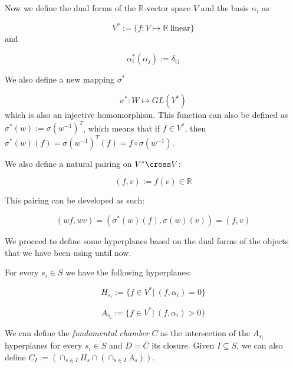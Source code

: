 Now we define the dual forms of the $\mathbb{R}$-vector space $V$ and the basis $\alpha_i$ as

\begin{equation}
 V^* := \{f: V \mapsto \mathbb{R}\  \text{linear} \}
\end{equation}
and

\begin{equation}
  \alpha_i^* (\alpha_j) := \delta_{ij}
\end{equation}

We also define a new mapping $\sigma^*$

\begin{equation}
 \sigma^* : W \mapsto GL(V^*)
\end{equation}
which is also an injective homomorphism. This function can also be defined as $\sigma^*(w) := \sigma(w^{-1})^T$, which means that if $f \in V^*$, then $\sigma^*(w)(f) = \sigma(w^{-1})^T(f) = f \circ \sigma(w^{-1})$.

We also define a natural pairing on $V^* \cross V$:

\begin{equation}
  (f,v) := f(v) \in \mathbb{R}
\end{equation}

This pairing can be developed as such:

\begin{equation}
(wf, wv) = (\sigma^*(w)(f), \sigma(w)(v)) = (f,v)
\end{equation}

We proceed to define some hyperplanes based on the dual forms of the objects that we have been using until now.

\begin{definition}
  For every $s_i \in S$ we have the following hyperplanes:

  \begin{equation}
    H_{s_i} := \{f \in V^* |\ (f, \alpha_i) = 0\}
  \end{equation}

  \begin{equation}
    A_{s_i} := \{f \in V^* |\ (f, \alpha_i) > 0\}
  \end{equation}

\end{definition}

We can define the \emph{fundamental chamber} $C$ as the intersection of the $A_{s_i}$ hyperplanes for every $s_i \in S$ and $D = \bar{C}$ its closure. Given $I \subseteq S$, we can also define $C_I := (\cap_{s\in I} H_s \cap (\cap_{s\in I} A_s))$.

